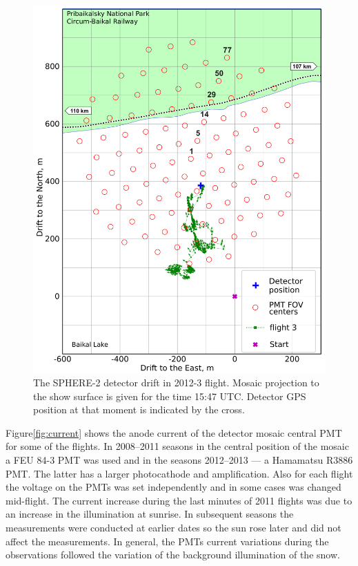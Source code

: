 \documentclass[universe,article,submit,moreauthors,pdftex]{Definitions/mdpi}
\begin{document}
\begin{figure}[tb]
\begin{minipage}[t]{0.48\textwidth}
        \includegraphics[width=\textwidth]{2012_drift-mod.pdf}
        \caption{The SPHERE-2 detector drift in 2012-3 flight. Mosaic projection to the show surface is given for the time 15:47 UTC. Detector GPS position at that moment is indicated by the cross.}
        \label{fig:2012-drift}
    \end{minipage}
\end{figure}

 Figure\ref{fig:current} shows the anode current of the detector mosaic central PMT for some of the flights. In 2008--2011 seasons in the central position of the mosaic a FEU 84-3 PMT was used and in the seasons 2012--2013 --- a Hamamatsu R3886 PMT. The latter has a larger photocathode and amplification. Also for each flight the voltage on the PMTs was set independently and in some cases was changed mid-flight. The current increase during the last minutes of 2011 flights was due to an increase in the illumination at sunrise. In subsequent seasons the measurements were conducted at earlier dates so the sun rose later and did not affect the measurements. In general, the PMTs current variations during the observations followed the variation of the background illumination of the snow.
\end{document}
